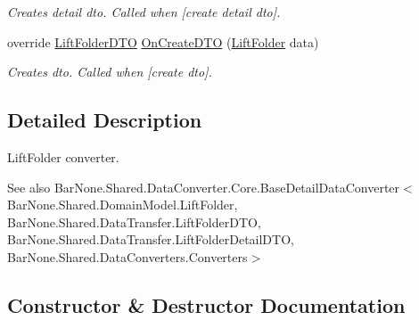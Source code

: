 \begin{DoxyCompactItemize}
\begin{DoxyCompactList}\small\item\em Creates detail dto. Called when \mbox{[}create detail dto\mbox{]}. \end{DoxyCompactList}\item 
override \mbox{\hyperlink{class_bar_none_1_1_shared_1_1_data_transfer_1_1_lift_folder_d_t_o}{Lift\+Folder\+D\+TO}} \mbox{\hyperlink{class_bar_none_1_1_shared_1_1_data_converters_1_1_lift_folder_converter_a9e9000bc478d26151ca4941de25212a3}{On\+Create\+D\+TO}} (\mbox{\hyperlink{class_bar_none_1_1_shared_1_1_domain_model_1_1_lift_folder}{Lift\+Folder}} data)
\begin{DoxyCompactList}\small\item\em Creates dto. Called when \mbox{[}create dto\mbox{]}. \end{DoxyCompactList}\end{DoxyCompactItemize}


\subsection{Detailed Description}
Lift\+Folder converter. 

\begin{DoxySeeAlso}{See also}
Bar\+None.\+Shared.\+Data\+Converter.\+Core.\+Base\+Detail\+Data\+Converter$<$\+Bar\+None.\+Shared.\+Domain\+Model.\+Lift\+Folder, Bar\+None.\+Shared.\+Data\+Transfer.\+Lift\+Folder\+D\+T\+O, Bar\+None.\+Shared.\+Data\+Transfer.\+Lift\+Folder\+Detail\+D\+T\+O, Bar\+None.\+Shared.\+Data\+Converters.\+Converters$>$


\end{DoxySeeAlso}


\subsection{Constructor \& Destructor Documentation}
\mbox{\label{class_bar_none_1_1_shared_1_1_data_converters_1_1_lift_folder_converter_a6b2f8da11be24dd236ab042648ea239c}} 
